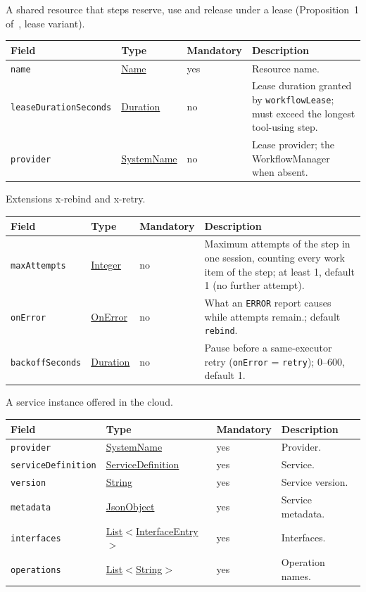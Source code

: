\documentclass[a4paper]{arrowhead}
\newcommand{\mref}[1]{{\textcolor{ArrowheadPurple}{\hyperref[sec:model:#1]{#1}}}}
\newcommand{\pref}[1]{{\textcolor{ArrowheadGrey}{\hyperref[sec:model:primitives:#1]{#1}}}}
\begin{document}
A shared resource that steps reserve, use and release under a lease (Proposition~1 of~\cite{varga2026}, lease variant).

{\small
\begin{longtable}{|p{3.7cm}|p{4.2cm}|p{1.6cm}|p{6.3cm}|}

\hline
\rowcolor{gray!33} Field & Type & Mandatory & Description \\ \hline
\endhead
\texttt{name} & \pref{Name} & yes & Resource name. \\ \hline
\texttt{lease\allowbreak{}Duration\allowbreak{}Seconds} & \pref{Duration} & no & Lease duration granted by \texttt{workflowLease}; must exceed the longest tool-using step. \\ \hline
\texttt{provider} & \pref{SystemName} & no & Lease provider; the WorkflowManager when absent. \\ \hline
\end{longtable}
}

Extensions x-rebind and x-retry.

{\small
\begin{longtable}{|p{3.7cm}|p{4.2cm}|p{1.6cm}|p{6.3cm}|}

\hline
\rowcolor{gray!33} Field & Type & Mandatory & Description \\ \hline
\endhead
\texttt{maxAttempts} & \pref{Integer} & no & Maximum attempts of the step in one session, counting every work item of the step; at least 1, default 1 (no further attempt). \\ \hline
\texttt{onError} & \mref{OnError} & no & What an \texttt{ERROR} report causes while attempts remain.; default \texttt{rebind}. \\ \hline
\texttt{backoff\allowbreak{}Seconds} & \pref{Duration} & no & Pause before a same-executor retry (\texttt{onError} = \texttt{retry}); 0--600, default 1. \\ \hline
\end{longtable}
}

A service instance offered in the cloud.

{\small
\begin{longtable}{|p{3.7cm}|p{4.2cm}|p{1.6cm}|p{6.3cm}|}

\hline
\rowcolor{gray!33} Field & Type & Mandatory & Description \\ \hline
\endhead
\texttt{provider} & \pref{SystemName} & yes & Provider. \\ \hline
\texttt{service\allowbreak{}Definition} & \pref{ServiceDefinition} & yes & Service. \\ \hline
\texttt{version} & \pref{String} & yes & Service version. \\ \hline
\texttt{metadata} & \pref{JsonObject} & yes & Service metadata. \\ \hline
\texttt{interfaces} & \pref{List}$<$\mref{InterfaceEntry}$>$ & yes & Interfaces. \\ \hline
\texttt{operations} & \pref{List}$<$\pref{String}$>$ & yes & Operation names. \\ \hline
\end{longtable}
}
\end{document}
